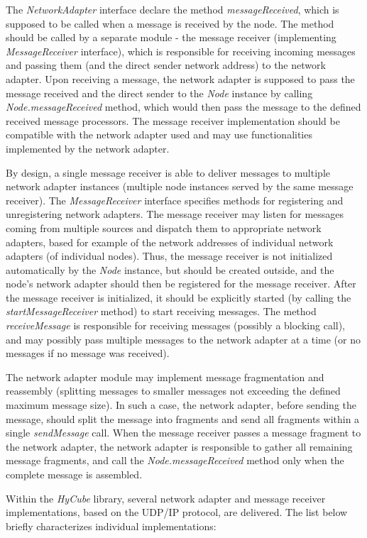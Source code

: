 The \emph{NetworkAdapter} interface declare the method \emph{messageReceived}, which is supposed to be called when a message is received by the node. The method should be called by a separate module - the message receiver (implementing \emph{MessageReceiver} interface), which is responsible for receiving incoming messages and passing them (and the direct sender network address) to the network adapter. Upon receiving a message, the network adapter is supposed to pass the message received and the direct sender to the \emph{Node} instance by calling \emph{Node.messageReceived} method, which would then pass the message to the defined received message processors. The message receiver implementation should be compatible with the network adapter used and may use functionalities implemented by the network adapter.

By design, a single message receiver is able to deliver messages to multiple network adapter instances (multiple node instances served by the same message receiver). The \emph{MessageReceiver} interface specifies methods for registering and unregistering network adapters. The message receiver may listen for messages coming from multiple sources and dispatch them to appropriate network adapters, based for example of the network addresses of individual network adapters (of individual nodes). Thus, the message receiver is not initialized automatically by the \emph{Node} instance, but should be created outside, and the node's network adapter should then be registered for the message receiver. After the message receiver is initialized, it should be explicitly started (by calling the \emph{startMessageReceiver} method) to start receiving messages. The method \emph{receiveMessage} is responsible for receiving messages (possibly a blocking call), and may possibly pass multiple messages to the network adapter at a time (or no messages if no message was received).

The network adapter module may implement message fragmentation and reassembly (splitting messages to smaller messages not exceeding the defined maximum message size). In such a case, the network adapter, before sending the message, should split the message into fragments and send all fragments within a single \emph{sendMessage} call. When the message receiver passes a message fragment to the network adapter, the network adapter is responsible to gather all remaining message fragments, and call the \emph{Node.messageReceived} method only when the complete message is assembled.

Within the \emph{HyCube} library, several network adapter and message receiver implementations, based on the UDP/IP protocol, are delivered. The list below briefly characterizes individual implementations:

